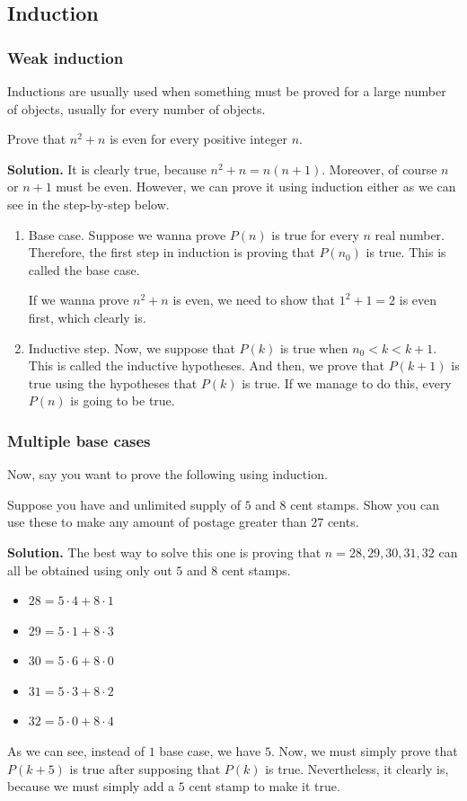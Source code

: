 \subsection{\textsf{Induction}}
\subsubsection{Weak induction}
Inductions are usually used when something must be proved for a large number of
objects, usually for every number of objects.
\begin{example}{}{}
	Prove that $n^2+n$ is even for every positive integer $n$.
\end{example}
\textcolor{color2}{\textbf{Solution. }} It is clearly true, because $n^2+n=n(n+1)$. Moreover, of course $n$ or $n+1$ must be even.
However, we can prove it using induction either as we can see in the step-by-step below.
\begin{enumerate}
	\item Base case. Suppose we wanna prove $P(n)$ is true for every $n$ real number. Therefore, the first step in induction
	      is proving that $P(n_0)$ is true. This is called the base case.

	      If we wanna prove $n^2+n$ is even, we need to show that $1^2+1=2$ is even first, which clearly is.
	\item Inductive step. Now, we suppose that $P(k)$ is true when $n_0<k<k+1$. This is called the inductive hypotheses. And
	      then, we prove that $P(k+1)$ is true using the hypotheses that $P(k)$ is true. If we manage to do this,
	      every $P(n)$ is going to be true.
\end{enumerate}
\subsubsection{Multiple base cases}
Now, say you want to prove the following using induction.
\begin{example}{}{}
	Suppose you have and unlimited supply of $5$ and $8$ cent stamps. Show you can use these to make any amount of postage greater than $27$ cents.
\end{example}
\textcolor{color2}{\textbf{Solution. }} The best way to solve this one is proving that $n=28,29,30,31,32$ can all be obtained using only out $5$ and $8$ cent stamps.
\begin{itemize}
	\item $28=5\cdot4 + 8\cdot1$
	\item $29=5\cdot1 + 8\cdot3$
	\item $30=5\cdot6 + 8\cdot0$
	\item $31=5\cdot3 + 8\cdot2$
	\item $32=5\cdot0+ 8\cdot4$
\end{itemize}
As we can see, instead of $1$ base case, we have $5$. Now, we must simply prove that $P(k+5)$ is true after supposing that
$P(k)$ is true. Nevertheless, it clearly is, because we must simply add a $5$ cent stamp to make it true.


